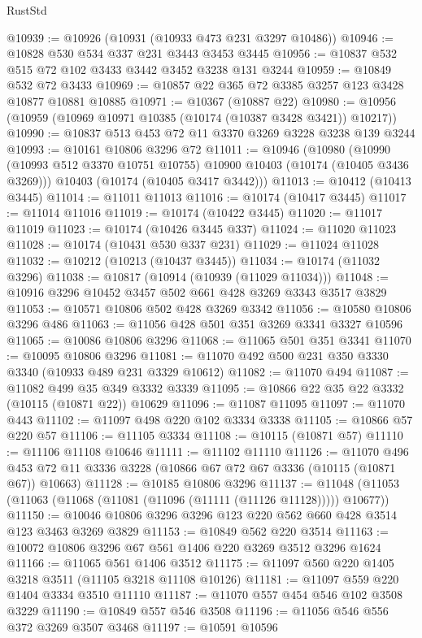 \begin{lexlean}{RustStd}
\begin{coremodule}
@10939 := @10926 (@10931 (@10933 @473 @231 @3297 @10486))
@10946 := @10828 @530 @534 @337 @231 @3443 @3453 @3445
@10956 := @10837 @532 @515 @72 @102 @3433 @3442 @3452 @3238 @131 @3244
@10959 := @10849 @532 @72 @3433
@10969 := @10857 @22 @365 @72 @3385 @3257 @123 @3428 @10877 @10881 @10885
@10971 := @10367 (@10887 @22)
@10980 := @10956 (@10959 (@10969 @10971 @10385 (@10174 (@10387 @3428 @3421)) @10217))
@10990 := @10837 @513 @453 @72 @11 @3370 @3269 @3228 @3238 @139 @3244
@10993 := @10161 @10806 @3296 @72
@11011 := @10946
    (@10980
      (@10990 (@10993 @512 @3370 @10751 @10755) @10900 @10403 (@10174 (@10405 @3436 @3269)))
      @10403
      (@10174 (@10405 @3417 @3442)))
@11013 := @10412 (@10413 @3445)
@11014 := @11011 @11013
@11016 := @10174 (@10417 @3445)
@11017 := @11014 @11016
@11019 := @10174 (@10422 @3445)
@11020 := @11017 @11019
@11023 := @10174 (@10426 @3445 @337)
@11024 := @11020 @11023
@11028 := @10174 (@10431 @530 @337 @231)
@11029 := @11024 @11028
@11032 := @10212 (@10213 (@10437 @3445))
@11034 := @10174 (@11032 @3296)
@11038 := @10817 (@10914 (@10939 (@11029 @11034)))
@11048 := @10916 @3296 @10452 @3457 @502 @661 @428 @3269 @3343 @3517 @3829
@11053 := @10571 @10806 @502 @428 @3269 @3342
@11056 := @10580 @10806 @3296 @486
@11063 := @11056 @428 @501 @351 @3269 @3341 @3327 @10596
@11065 := @10086 @10806 @3296
@11068 := @11065 @501 @351 @3341
@11070 := @10095 @10806 @3296
@11081 := @11070 @492 @500 @231 @350 @3330 @3340 (@10933 @489 @231 @3329 @10612)
@11082 := @11070 @494
@11087 := @11082 @499 @35 @349 @3332 @3339
@11095 := @10866 @22 @35 @22 @3332 (@10115 (@10871 @22)) @10629
@11096 := @11087 @11095
@11097 := @11070 @443
@11102 := @11097 @498 @220 @102 @3334 @3338
@11105 := @10866 @57 @220 @57
@11106 := @11105 @3334
@11108 := @10115 (@10871 @57)
@11110 := @11106 @11108 @10646
@11111 := @11102 @11110
@11126 := @11070
    @496
    @453
    @72
    @11
    @3336
    @3228
    (@10866 @67 @72 @67 @3336 (@10115 (@10871 @67)) @10663)
@11128 := @10185 @10806 @3296
@11137 := @11048 (@11053 (@11063 (@11068 (@11081 (@11096 (@11111 (@11126 @11128))))) @10677))
@11150 := @10046 @10806 @3296 @3296 @123 @220 @562 @660 @428 @3514 @123 @3463 @3269 @3829
@11153 := @10849 @562 @220 @3514
@11163 := @10072 @10806 @3296 @67 @561 @1406 @220 @3269 @3512 @3296 @1624
@11166 := @11065 @561 @1406 @3512
@11175 := @11097 @560 @220 @1405 @3218 @3511 (@11105 @3218 @11108 @10126)
@11181 := @11097 @559 @220 @1404 @3334 @3510 @11110
@11187 := @11070 @557 @454 @546 @102 @3508 @3229
@11190 := @10849 @557 @546 @3508
@11196 := @11056 @546 @556 @372 @3269 @3507 @3468
@11197 := @10591 @10596

\end{coremodule}
\end{lexlean}
